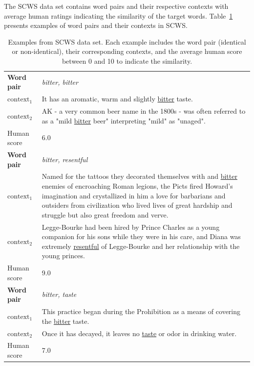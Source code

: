 The SCWS data set contains word pairs and their respective contexts with average human ratings indicating the similarity of the target words.
Table~\ref{iwdtexample} presents examples of word pairs and their contexts in SCWS. 
\begin{table}[tbh!]
\caption{Examples from SCWS data set. Each example includes the word pair (identical or non-identical), their corresponding contexts, and the average human score between 0 and 10 to indicate the similarity. \label{iwdtexample}} %
\centering
\small
\renewcommand{\tabcolsep}{3pt}
\begin{tabularx}{\textwidth}{lX}
\toprule
\textbf{Word pair} & \textit{bitter,  bitter}  \\
  \hdashline
$\text{context}_1$ & It has an aromatic, warm and slightly \underline{bitter} taste. \\
$\text{context}_2$ & AK - a very common beer name in the 1800s - was often referred to as a "mild \underline{bitter} beer" interpreting "mild" as "unaged". \\
  \hdashline
Human score & 6.0 \\
\midrule
\textbf{Word pair} & \textit{ bitter,   resentful}       \\
  \hdashline
$\text{context}_1$ &  Named for the tattoos they decorated themselves with and \underline{bitter} enemies of encroaching Roman legions, the Picts fired Howard's imagination and crystallized in him a love for barbarians and outsiders from civilization who lived lives of great hardship and struggle but also great freedom and verve. \\
$\text{context}_2$ &   Legge-Bourke had been hired by Prince Charles as a young companion for his sons while they were in his care, and Diana was extremely \underline{resentful} of Legge-Bourke and her relationship with the young princes.\\
  \hdashline
Human score & 9.0 \\
\midrule
\textbf{Word pair} & \textit{bitter,     taste}  \\
  \hdashline
$\text{context}_1$ & This practice began during the Prohibition as a means of covering the \underline{bitter} taste. \\
$\text{context}_2$ & Once it has decayed, it leaves no \underline{taste} or odor in drinking water. \\
  \hdashline
 Human score  & 7.0 \\
 \bottomrule
\end{tabularx}
\end{table}
